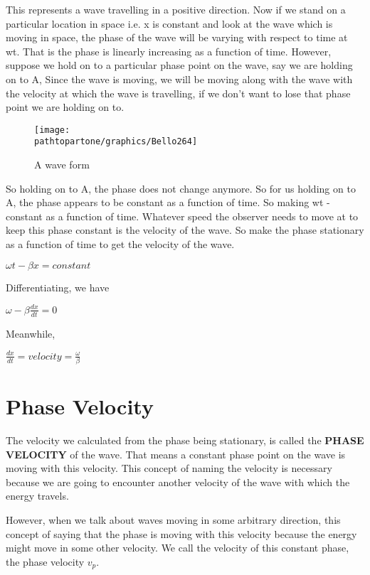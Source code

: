 This represents a wave travelling in a positive direction. Now if we stand on a particular location in space i.e. x is constant and look at the wave which is moving in space, the phase of the wave will be varying with respect to time at wt. That is the phase is linearly increasing as a function of time. However, suppose we hold on to a particular phase point on the wave, say we are holding on to A, Since the wave is moving, we will be moving along with the wave with the velocity at which the wave is travelling, if we don't want to lose that phase point we are holding on to.
\begin{figure}[h]
\centering
\texttt{[image: \\pathtopartone/graphics/Bello264]}
\caption{A wave form}
\end{figure}

So holding on to A, the phase does not change anymore. So for us holding on to A, the phase appears to be constant as a function of time. So making wt -   constant as a function of time. Whatever speed the observer needs to move at to keep this phase constant is the velocity of the wave. So make the phase stationary as a function of time to get the velocity of the wave.
\begin{center}
$\omega t-\beta x = constant$
\end{center}

Differentiating, we have
\begin{center}
$\omega-\beta\frac{dx}{dt}=0$
\end{center}

Meanwhile, 
\begin{center}
$\frac{dx}{dt}=velocity=\frac{\omega}{\beta}$
\end{center}

\section{\textbf{Phase Velocity}}
The velocity we calculated from the phase being stationary, is called the \textbf{PHASE VELOCITY} of the wave. That means a constant phase point on the wave is moving with this velocity. This concept of naming the velocity is necessary because we are going to encounter another velocity of the wave with which the energy travels.

However, when we talk about waves moving in some arbitrary direction, this concept of saying that the phase is moving with this velocity because the energy might move in some other velocity. We call the velocity of this constant phase, the phase velocity $ v_p $.

